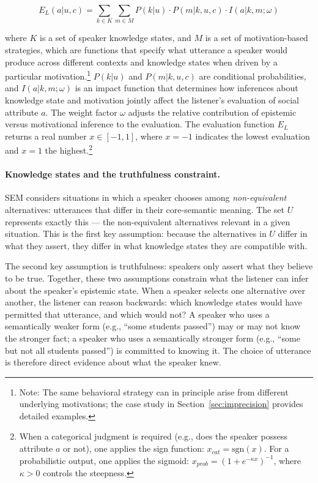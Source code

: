 \documentclass[12pt,a4paper]{article}
\begin{document}
\begin{equation}
E_{L}(a|u,c) = \sum_{k \in K} \sum_{m \in M}
  P(k|u) \cdot P(m|k,u,c) \cdot I(a|k,m;\omega)
\label{eq1}
\end{equation}

\noindent where $K$ is a set of speaker knowledge states, and $M$ is a set of
motivation-based strategies, which are functions
that specify what utterance a speaker would produce across different contexts
and knowledge states when driven by a particular motivation.\footnote{Note: The same behavioral
strategy can in principle arise from different underlying motivations; the case
study in Section~\ref{sec:imprecision} provides detailed examples.} $P(k|u)$
and $P(m|k,u,c)$ are conditional probabilities, and $I(a|k,m;\omega)$ is an
impact function that determines how inferences about knowledge state and
motivation jointly affect the listener's evaluation of social attribute $a$.
The weight factor $\omega$ adjusts the relative contribution of epistemic versus
motivational inference to the evaluation. The evaluation function $E_L$ returns
a real number $x \in [-1, 1]$, where $x = -1$ indicates the lowest evaluation
and $x = 1$ the highest.\footnote{When a categorical judgment is required
(e.g., does the speaker possess attribute $a$ or not), one applies the sign
function: $x_{cat} = \mathrm{sgn}(x)$. For a probabilistic output, one applies
the sigmoid: $x_{prob} = (1 + e^{-\kappa x})^{-1}$, where $\kappa > 0$ controls
the steepness.}

\paragraph{Knowledge states and the truthfulness constraint.}
SEM considers situations in which a speaker chooses among \emph{non-equivalent}
alternatives: utterances that differ in their core-semantic meaning. The set $U$
represents exactly this --- the non-equivalent alternatives relevant in a given
situation. This is the first key assumption: because the alternatives in $U$
differ in what they assert, they differ in what knowledge states they are
compatible with.

The second key assumption is truthfulness: speakers only assert what they believe
to be true. Together, these two assumptions constrain what the listener can infer
about the speaker's epistemic state. When a speaker selects one alternative over
another, the listener can reason backwards: which knowledge states would have
permitted that utterance, and which would not? A speaker who uses a semantically
weaker form (e.g., ``some students passed'') may or may not know the stronger
fact; a speaker who uses a semantically stronger form (e.g., ``some but not all
students passed'') is committed to knowing it. The choice of utterance is
therefore direct evidence about what the speaker knew.
\end{document}
